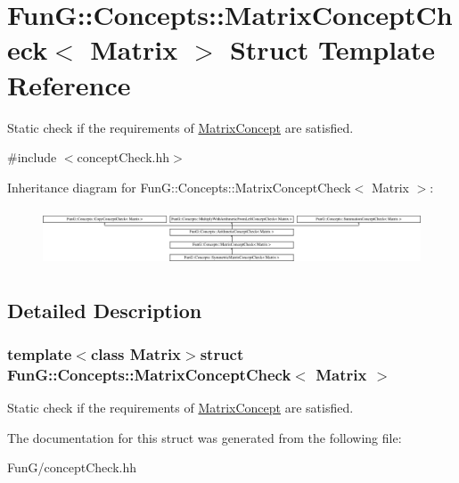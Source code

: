\hypertarget{structFunG_1_1Concepts_1_1MatrixConceptCheck}{\section{Fun\-G\-:\-:Concepts\-:\-:Matrix\-Concept\-Check$<$ Matrix $>$ Struct Template Reference}
\label{structFunG_1_1Concepts_1_1MatrixConceptCheck}
}


Static check if the requirements of \hyperlink{structFunG_1_1Concepts_1_1MatrixConcept}{Matrix\-Concept} are satisfied.  




{\ttfamily \#include $<$concept\-Check.\-hh$>$}

Inheritance diagram for Fun\-G\-:\-:Concepts\-:\-:Matrix\-Concept\-Check$<$ Matrix $>$\-:\begin{figure}[H]
\begin{center}
\leavevmode
\includegraphics[height=1.728395cm]{structFunG_1_1Concepts_1_1MatrixConceptCheck}
\end{center}
\end{figure}


\subsection{Detailed Description}
\subsubsection*{template$<$class Matrix$>$struct Fun\-G\-::\-Concepts\-::\-Matrix\-Concept\-Check$<$ Matrix $>$}

Static check if the requirements of \hyperlink{structFunG_1_1Concepts_1_1MatrixConcept}{Matrix\-Concept} are satisfied. 

The documentation for this struct was generated from the following file\-:\begin{DoxyCompactItemize}
\item 
Fun\-G/concept\-Check.\-hh\end{DoxyCompactItemize}
